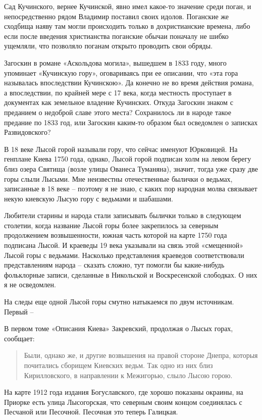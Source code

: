 Сад Кучинского, вернее Кучинской, явно имел какое-то значение среди поган, и непосредственно рядом Владимир поставил своих идолов. Поганские же сходбища наяву там могли происходить только в дохристианские времена, либо если после введения христианства поганские обычаи поначалу не шибко ущемляли, что позволяло поганам открыто проводить свои обряды.

Загоскин в романе «Аскольдова могила», вышедшем в 1833 году, много упоминает  «Кучинскую гору», оговариваясь при ее описании, что «эта гора называлась впоследствии Кучинскою». Да конечно не во время действия романа, а впоследствии, по крайней мере с 17 века, когда местность проступает в документах как земельное владение Кучинских. Откуда Загоскин знаком с преданием о недоброй славе этого места? Сохранилось ли в народе такое предание по 1833 год, или Загоскин каким-то образом был осведомлен о записках Развидовского?

В 18 веке Лысой горой называли гору, что сейчас именуют Юрковицей. На генплане Киева 1750 года, однако, Лысой горой подписан холм на левом берегу близ озера Святища (возле улицы Ованеса Туманяна), значит, тогда уже сразу две горы слыли Лысыми. Мне неизвестны отечественные былички о ведьмах, записанные в 18 веке – поэтому я не знаю, с каких пор народная молва связывает некую киевскую Лысую гору с ведьмами и шабашами.

Любители старины и народа стали записывать былички только в следующем столетии, когда название Лысой горы более закрепилось за северным продолжением возвышенности, южная часть которой на карте 1750 года подписана Лысой. И краеведы 19 века указывали на связь этой «смещенной» Лысой горы с ведьмами. Насколько представления краеведов соответствовали представлениям народа – сказать сложно, тут помогли бы какие-нибудь фольклорные записи, сделанные в Никольской и Воскресенской слободках. О них я не осведомлен.

На следы еще одной Лысой горы смутно натыкаемся по двум источникам. Первый – 

В первом томе «Описания Киева» Закревский, продолжая о Лысых горах, сообщает:

\begin{quotation}
Были, однако же, и другие возвышения на правой стороне Днепра, которыя почитались сборищем Киевских ведьм. Так одно из них близ Кирилловского, в направлении к Межигорью, слыло Лысою горою.
\end{quotation}

На карте 1912 года издания Богуславского, где хорошо показаны окраины, на Приорке есть улица Лысогорская, что северным своим концом соединялась с Песчаной или Песочной. Песочная это теперь Галицкая.


